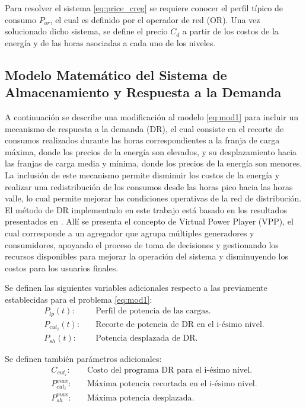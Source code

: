 Para resolver el sistema \eqref{eq:price_creg} se requiere conocer el perfil típico de consumo $P_{or}$, el cual es definido por el operador de red (OR). Una vez solucionado dicho sistema, se define el precio $C_d$ a partir de los costos de la energía y de las horas asociadas a cada uno de los niveles.

\subsection{Modelo Matemático del Sistema de Almacenamiento y Respuesta a la Demanda}\label{sec:modeloDR}
A continuación se describe una modificación al modelo \eqref{eq:mod1} para incluir un mecanismo de respuesta a la demanda (DR), el cual consiste en el recorte de consumos realizados durante las horas correspondientes a la franja de carga máxima, donde los precios de la energía son elevados, y su desplazamiento hacia las franjas de carga media y mínima, donde los precios de la energía son menores. La inclusión de este mecanismo permite disminuir los costos de la energía y realizar una redistribución de los consumos desde las horas pico hacia las horas valle, lo cual permite mejorar las condiciones operativas de la red de distribución. El método de DR implementado en este trabajo está basado en los resultados presentados en \cite{7741905}. Allí se presenta el concepto de Virtual Power Player (VPP), el cual corresponde a un agregador que agrupa múltiples generadores y consumidores, apoyando el proceso de toma de decisiones y gestionando los recursos disponibles para mejorar la operación del sistema y disminuyendo los costos para los usuarios finales.

Se definen las siguientes variables adicionales respecto a las previamente establecidas para el problema \eqref{eq:mod1}:
\begin{align*}
	P_{lp}(t): \quad & \text{Perfil de potencia de las cargas.}\\
	P_{cut_i}(t): \quad & \text{Recorte de potencia de DR en el i-ésimo nivel.}\\
	P_{sh}(t): \quad & \text{Potencia desplazada de DR.}
\end{align*}

Se definen también parámetros adicionales:
\begin{align*}
	C_{cut_i}: \quad & \text{Costo del programa DR para el i-ésimo nivel.}\\
	P_{cut_i}^{max}: \quad & \text{Máxima potencia recortada en el i-ésimo nivel.}\\
	P_{sh}^{max}: \quad & \text{Máxima potencia desplazada.}
\end{align*}

